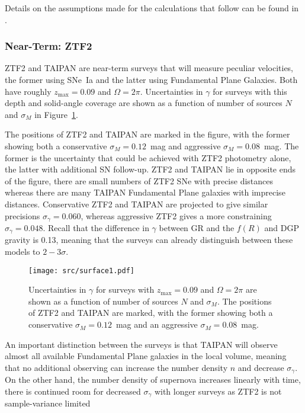 Details on the assumptions made for the calculations that follow can be found in \citet{2019BAAS...51c.140K}.

\subsubsection{Near-Term: ZTF2}
ZTF2 and TAIPAN are near-term surveys that will measure peculiar velocities, the former using SNe~Ia and the latter
using Fundamental Plane Galaxies.  Both have roughly
 $z_{\text{max}}=0.09$ and $\Omega = 2\pi$.
Uncertainties in $\gamma$ for surveys with this depth and solid-angle coverage 
are shown as a function of number of sources $N$ and $\sigma_M$ in Figure~\ref{surface:fig}. 

The positions of ZTF2 and TAIPAN are marked
in the figure, with the former showing both  a conservative $\sigma_M=0.12$~mag and aggressive $\sigma_M=0.08$~mag.
The former is the uncertainty that could be achieved with ZTF2 photometry alone, the latter with additional
SN follow-up.
ZTF2 and TAIPAN lie in opposite ends of the figure, there are small numbers of ZTF2 SNe with precise distances
whereas there are many TAIPAN Fundamental Plane galaxies with imprecise distances. 
Conservative ZTF2 and TAIPAN
are projected to give similar precisions $\sigma_ \gamma = 0.060$, whereas  aggressive ZTF2 gives a more constraining
$\sigma_ \gamma = 0.048$.  
Recall that the difference in $\gamma$  between GR and the $f(R)$ and DGP gravity is 0.13, meaning that the surveys
can already distinguish between these models to $2-3 \sigma$.

\begin{figure}
\centering
\texttt{[image: src/surface1.pdf]}
\caption{Uncertainties in $\gamma$ for surveys  with $z_{\text{max}}=0.09$ and $\Omega = 2\pi$
are shown as a function of number of sources $N$ and $\sigma_M$.  The positions of ZTF2 and TAIPAN are marked,
with the former showing both  a conservative $\sigma_M=0.12$~mag and an aggressive $\sigma_M=0.08$~mag.
\label{surface:fig}}
\end{figure}

An important distinction between the surveys is
that TAIPAN will observe almost all available Fundamental Plane galaxies in the local volume, meaning that no additional observing can
increase the number density $n$ and decrease $\sigma_\gamma$.  On the other hand, the number density of supernova increases
linearly with time, there is continued room for decreased $\sigma_\gamma$ with longer surveys  as ZTF2 is not  sample-variance limited 


